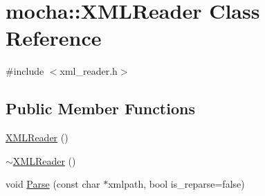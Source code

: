 \hypertarget{classmocha_1_1_x_m_l_reader}{
\section{mocha::XMLReader Class Reference}
\label{classmocha_1_1_x_m_l_reader}
}


{\ttfamily \#include $<$xml\_\-reader.h$>$}

\subsection*{Public Member Functions}
\begin{DoxyCompactItemize}
\item 
\hyperlink{classmocha_1_1_x_m_l_reader_a8e6a9c21c7be6a982afc265c0e62a1eb}{XMLReader} ()
\item 
\hyperlink{classmocha_1_1_x_m_l_reader_a299712ccf1fc12b407855d705634e4b7}{$\sim$XMLReader} ()
\item 
void \hyperlink{classmocha_1_1_x_m_l_reader_aa56524c6a873198b14159cfc5d5f8f1d}{Parse} (const char $\ast$xmlpath, bool is\_\-reparse=false)
\end{DoxyCompactItemize}
